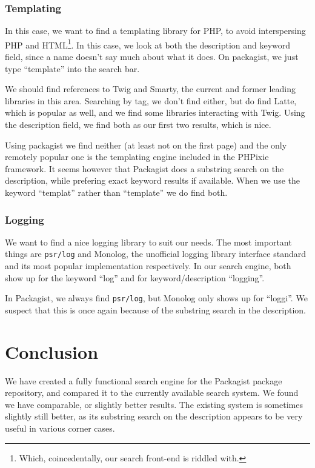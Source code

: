 \documentclass{article}
\begin{document}
\subsubsection{Templating}

In this case, we want to find a templating library for PHP, to avoid interspersing PHP and HTML\footnote{Which, coincedentally, our search front-end is riddled with.}. In this case, we look at both the description and keyword field, since a name doesn't say much about what it does. On packagist, we just type ``template'' into the search bar.

We should find references to Twig and Smarty, the current and former leading libraries in this area. Searching by tag, we don't find either, but do find Latte, which is popular as well, and we find some libraries interacting with Twig. Using the description field, we find both as our first two results, which is nice.

Using packagist we find neither (at least not on the first page) and the only remotely popular one is the templating engine included in the PHPixie framework. It seems however that Packagist does a substring search on the description, while prefering exact keyword results if available. When we use the keyword ``templat'' rather than ``template'' we do find both.

\subsubsection{Logging}

We want to find a nice logging library to suit our needs. The most important things are \texttt{psr/log} and Monolog, the unofficial logging library interface standard and its most popular implementation respectively. In our search engine, both show up for the keyword ``log'' and for keyword/description ``logging''.

In Packagist, we always find \texttt{psr/log}, but Monolog only shows up for ``loggi''. We suspect that this is once again because of the substring search in the description.


\section{Conclusion}

We have created a fully functional search engine for the Packagist package repository, and compared it to the currently available search system. We found we have comparable, or slightly better results. The existing system is sometimes slightly still better, as its substring search on the description appears to be very useful in various corner cases.
\end{document}
